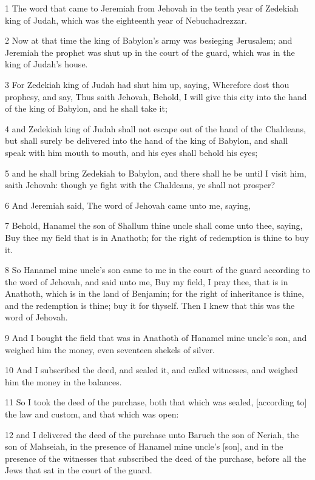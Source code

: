 \par 1 The word that came to Jeremiah from Jehovah in the tenth year of Zedekiah king of Judah, which was the eighteenth year of Nebuchadrezzar.
\par 2 Now at that time the king of Babylon's army was besieging Jerusalem; and Jeremiah the prophet was shut up in the court of the guard, which was in the king of Judah's house.
\par 3 For Zedekiah king of Judah had shut him up, saying, Wherefore dost thou prophesy, and say, Thus saith Jehovah, Behold, I will give this city into the hand of the king of Babylon, and he shall take it;
\par 4 and Zedekiah king of Judah shall not escape out of the hand of the Chaldeans, but shall surely be delivered into the hand of the king of Babylon, and shall speak with him mouth to mouth, and his eyes shall behold his eyes;
\par 5 and he shall bring Zedekiah to Babylon, and there shall he be until I visit him, saith Jehovah: though ye fight with the Chaldeans, ye shall not prosper?
\par 6 And Jeremiah said, The word of Jehovah came unto me, saying,
\par 7 Behold, Hanamel the son of Shallum thine uncle shall come unto thee, saying, Buy thee my field that is in Anathoth; for the right of redemption is thine to buy it.
\par 8 So Hanamel mine uncle's son came to me in the court of the guard according to the word of Jehovah, and said unto me, Buy my field, I pray thee, that is in Anathoth, which is in the land of Benjamin; for the right of inheritance is thine, and the redemption is thine; buy it for thyself. Then I knew that this was the word of Jehovah.
\par 9 And I bought the field that was in Anathoth of Hanamel mine uncle's son, and weighed him the money, even seventeen shekels of silver.
\par 10 And I subscribed the deed, and sealed it, and called witnesses, and weighed him the money in the balances.
\par 11 So I took the deed of the purchase, both that which was sealed, [according to] the law and custom, and that which was open:
\par 12 and I delivered the deed of the purchase unto Baruch the son of Neriah, the son of Mahseiah, in the presence of Hanamel mine uncle's [son], and in the presence of the witnesses that subscribed the deed of the purchase, before all the Jews that sat in the court of the guard.
